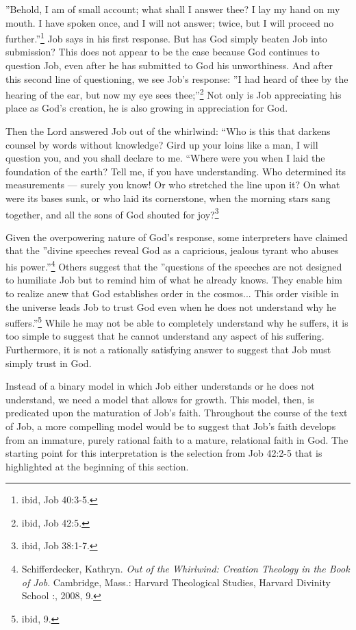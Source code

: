 ''Behold, I am of small account; what shall I answer thee? I lay my hand on my mouth. I have spoken once, and I will not answer; twice, but I will proceed no further.''\footnote{ibid, Job 40:3-5.} Job says in his first response. But has God simply beaten Job into submission? This does not appear to be the case because God continues to question Job, even after he has submitted to God his unworthiness. And after this second line of questioning, we see Job's response: ''I had heard of thee by the hearing of the ear, but now my eye sees thee;''\footnote{ibid, Job 42:5.} Not only is Job appreciating his place as God's creation, he is also growing in appreciation for God.


Then the Lord answered Job out of the whirlwind: ``Who is this that darkens counsel by words without knowledge? Gird up your loins like a man, I will question you, and you shall declare to me. ``Where were you when I laid the foundation of the earth? Tell me, if you have understanding. Who determined its measurements --- surely you know! Or who stretched the line upon it? On what were its bases sunk, or who laid its cornerstone, when the morning stars sang together, and all the sons of God shouted for joy?\footnote{ibid, Job 38:1-7.}


Given the overpowering nature of God's response, some interpreters have claimed that the ''divine speeches reveal God as a capricious, jealous tyrant who abuses his power.''\footnote{Schifferdecker, Kathryn. \emph{Out of the Whirlwind: Creation Theology in the Book of Job}. Cambridge, Mass.: Harvard Theological Studies, Harvard Divinity School :, 2008, 9.} Others suggest that the ''questions of the speeches are not designed to humiliate Job but to remind him of what he already knows. They enable him to realize anew that God establishes order in the cosmos... This order visible in the universe leads Job to trust God even when he does not understand why he suffers.''\footnote{ibid, 9.} While he may not be able to completely understand why he suffers, it is too simple to suggest that he cannot understand any aspect of his suffering. Furthermore, it is not a rationally satisfying answer to suggest that Job must simply trust in God.

Instead of a binary model in which Job either understands or he does not understand, we need a model that allows for growth. This model, then, is predicated upon the maturation of Job's faith. Throughout the course of the text of Job, a more compelling model would be to suggest that Job's faith develops from an immature, purely rational faith to a mature, relational faith in God. The starting point for this interpretation is the selection from Job 42:2-5 that is highlighted at the beginning of this section.

